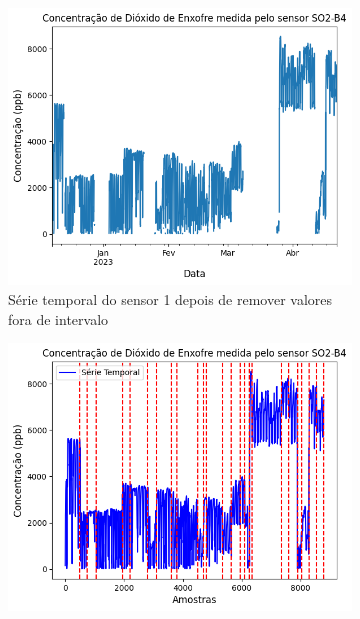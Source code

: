 \begin{figure}[h!]
    \centering
    \caption{Série temporal dos sensores de \acrshort{so2} modelo SO2-B4}
    \begin{subfigure}{0.495\textwidth}
        \includegraphics[width=\textwidth]{aftertext/Leituras SO2/raw-so2-b4-1.png}
        \caption{Série temporal do sensor 1 depois de remover valores fora de intervalo}
        \label{fig:data-so2-1-raw}
    \end{subfigure}
    \hfill
    \begin{subfigure}{0.495\textwidth}
        \includegraphics[width=\textwidth]{aftertext/Leituras SO2/rebase-so2-b4-1.png}

\end{subfigure}
\end{figure}
